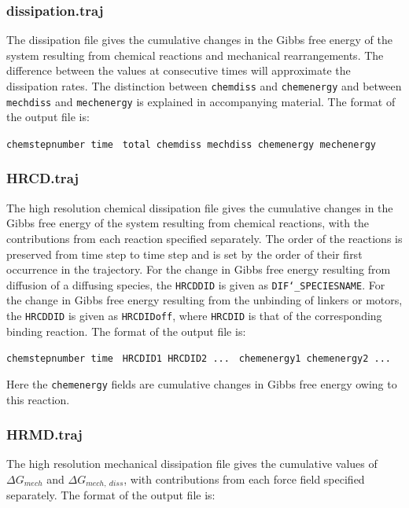 \documentclass[11pt, oneside]{article}   	%
\begin{document}
\subsubsection{dissipation.traj}
The dissipation file gives the cumulative changes in the Gibbs free energy of the system resulting from chemical reactions and mechanical rearrangements.  The difference between the values at consecutive times will approximate the dissipation rates.  The distinction between \texttt{chemdiss} and \texttt{chemenergy} and between \texttt{mechdiss} and \texttt{mechenergy} is explained in accompanying material.  The format of the output file is:\newline

\noindent\texttt{chemstepnumber time }\newline
\texttt{total chemdiss mechdiss chemenergy mechenergy}\newline


\subsubsection{HRCD.traj}
The high resolution chemical dissipation file gives the cumulative changes in the Gibbs free energy of the system resulting from chemical reactions, with the contributions from each reaction specified separately.  The order of the reactions is preserved from time step to time step and is set by the order of their first occurrence in the trajectory.  For the change in Gibbs free energy resulting from diffusion of a diffusing species, the \texttt{HRCDDID} is given as \texttt{DIF\char`_SPECIESNAME}.  For the change in Gibbs free energy resulting from the unbinding of linkers or motors, the  \texttt{HRCDDID} is given as \texttt{HRCDIDoff}, where \texttt{HRCDID} is that of the corresponding binding reaction.  The format of the output file is:\newline

\noindent\texttt{chemstepnumber time }\newline
\texttt{HRCDID1 HRCDID2 ... }\newline
\texttt{chemenergy1 chemenergy2 ... }\newline

Here the \texttt{chemenergy} fields are cumulative changes in Gibbs free energy owing to this reaction.  


\subsubsection{HRMD.traj}
The high resolution mechanical dissipation file gives the cumulative values of $\Delta G_{mech}$ and $\Delta G_{mech, \ diss}$, with contributions from each force field specified separately.  
  The format of the output file is:\newline
\end{document}
